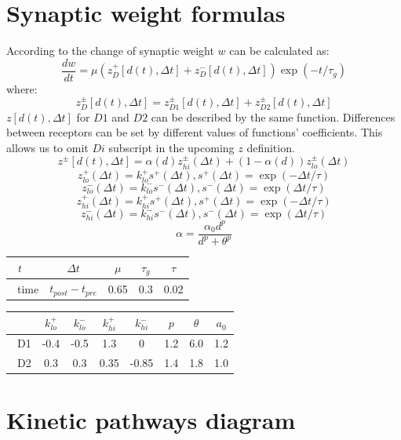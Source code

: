 \documentclass[twoside,twocolumn]{article}
\begin{document}
\section{Synaptic weight formulas}
\begin{strip}
According to \cite[p.~20]{gurney_new_2015} the change of synaptic weight $w$ can be calculated as:
\[ \frac{dw}{dt} = \mu(z^{+}_{D}[d(t),\Delta t] + z^{-}_{D}[d(t),\Delta t])\exp(-t/\tau_{g}) \]
where:
\[ z^{\pm}_{D}[d(t),\Delta t] = z^{\pm}_{D1}[d(t),\Delta t] + z^{\pm}_{D2}[d(t),\Delta t]\]
$z[d(t),\Delta t]$ for $D1$ and $D2$ can be described by the same function. Differences between receptors can be set by different values of functions' coefficients. This allows us to omit $Di$ subscript in the upcoming $z$ definition.
\[ z^{\pm}[d(t),\Delta t] = \alpha(d)z^{\pm}_{hi}(\Delta t) + (1 - \alpha(d))z^{\pm}_{lo}(\Delta t) \]
\[ z^{+}_{lo}(\Delta t) = k^{+}_{lo}s^{+}(\Delta t) , s^{+}(\Delta t) = \exp(-\Delta t/\tau) \]
\[ z^{-}_{lo}(\Delta t) = k^{-}_{lo}s^{-}(\Delta t) , s^{-}(\Delta t) = \exp(\Delta t/\tau) \]
\[ z^{+}_{hi}(\Delta t) = k^{+}_{hi}s^{+}(\Delta t) , s^{+}(\Delta t) = \exp(-\Delta t/\tau) \]
\[ z^{-}_{hi}(\Delta t) = k^{-}_{hi}s^{-}(\Delta t) , s^{-}(\Delta t) = \exp(\Delta t/\tau) \]
\[ \alpha = \frac{\alpha_{0}d^{p}}{d^{p} + \theta^{p}} \]

\begin{tabular}{|l|*{4}{c|}}
  \hline
   \ $t$ &$\Delta t$        &$\mu$&$\tau_{g}$&$\tau$ \\ \hline
   \ time&$t_{post}-t_{pre}$&0.65 &0.3       &0.02   \\ \hline
\end{tabular}
\begin{tabular}{|l|*{7}{c|}}
  \hline
   \   & $k^{+}_{lo}$ & $k^{-}_{lo}$ & $k^{+}_{hi}$ & $k^{-}_{hi}$ & $p$ & $\theta$ & $a_{0}$ \\ \hline
   \ D1 & -0.4        & -0.5         & 1.3          & 0            & 1.2 & 6.0      & 1.2     \\ \hline
   \ D2 & 0.3         & 0.3          & 0.35         & -0.85        & 1.4 & 1.8      & 1.0     \\ \hline
\end{tabular}
\end{strip}

\section{Kinetic pathways diagram}

\end{document}

